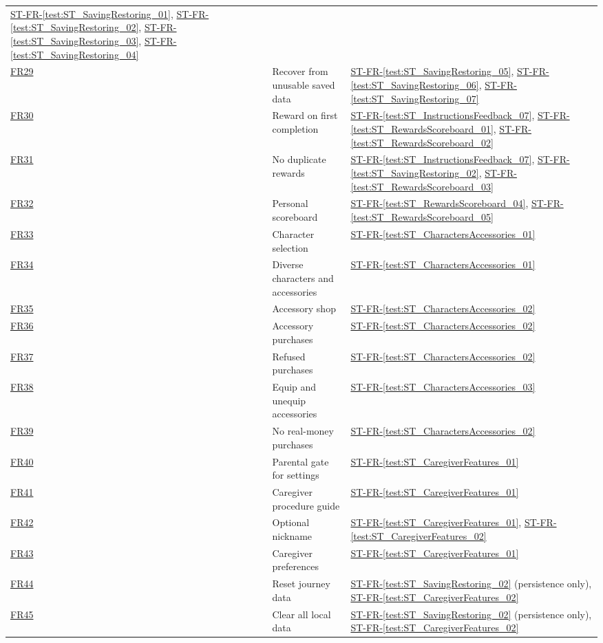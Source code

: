 \documentclass[10pt,titlepage]{article}
\newcommand{\frtestref}[1]{%
    \hyperref[test:#1]{ST-FR-\ref*{test:#1}}}
\newcommand{\srsurl}{https://team-hindsight.github.io/ophthamology-game/SRS/SRS.pdf}
\newcommand{\srsfrref}[2]{\href{\srsurl\#nameddest=#1}{FR#2}}
\begin{document}
\begin{longtable}{@{}>{\raggedright\arraybackslash}p{}
  >{\raggedright\arraybackslash}p{}
  >{\raggedright\arraybackslash}p{}@{}}
  \frtestref{ST_SavingRestoring_01}, \frtestref{ST_SavingRestoring_02}, \frtestref{ST_SavingRestoring_03}, \frtestref{ST_SavingRestoring_04}\\
\srsfrref{FR_CorruptData}{29} & Recover from unusable saved data &
  \frtestref{ST_SavingRestoring_05}, \frtestref{ST_SavingRestoring_06}, \frtestref{ST_SavingRestoring_07}\\
\srsfrref{FR_FirstReward}{30} & Reward on first completion &
  \frtestref{ST_InstructionsFeedback_07}, \frtestref{ST_RewardsScoreboard_01}, \frtestref{ST_RewardsScoreboard_02}\\
\srsfrref{FR_NoDuplicateReward}{31} & No duplicate rewards &
  \frtestref{ST_InstructionsFeedback_07}, \frtestref{ST_SavingRestoring_02}, \frtestref{ST_RewardsScoreboard_03}\\
\srsfrref{FR_Scoreboard}{32} & Personal scoreboard &
  \frtestref{ST_RewardsScoreboard_04}, \frtestref{ST_RewardsScoreboard_05}\\
\srsfrref{FR_ChooseCharacter}{33} & Character selection & \frtestref{ST_CharactersAccessories_01}\\
\srsfrref{FR_DiverseCharacters}{34} & Diverse characters and accessories & \frtestref{ST_CharactersAccessories_01}\\
\srsfrref{FR_Shop}{35} & Accessory shop & \frtestref{ST_CharactersAccessories_02}\\
\srsfrref{FR_Purchase}{36} & Accessory purchases & \frtestref{ST_CharactersAccessories_02}\\
\srsfrref{FR_PurchaseRefused}{37} & Refused purchases & \frtestref{ST_CharactersAccessories_02}\\
\srsfrref{FR_Equip}{38} & Equip and unequip accessories & \frtestref{ST_CharactersAccessories_03}\\
\srsfrref{FR_NoRealMoney}{39} & No real-money purchases & \frtestref{ST_CharactersAccessories_02}\\
\srsfrref{FR_ParentGate}{40} & Parental gate for settings & \frtestref{ST_CaregiverFeatures_01}\\
\srsfrref{FR_ProcedureGuide}{41} & Caregiver procedure guide & \frtestref{ST_CaregiverFeatures_01}\\
\srsfrref{FR_Nickname}{42} & Optional nickname &
  \frtestref{ST_CaregiverFeatures_01}, \frtestref{ST_CaregiverFeatures_02}\\
\srsfrref{FR_Preferences}{43} & Caregiver preferences & \frtestref{ST_CaregiverFeatures_01}\\
\srsfrref{FR_ResetJourney}{44} & Reset journey data &
  \frtestref{ST_SavingRestoring_02} (persistence only), \frtestref{ST_CaregiverFeatures_02}\\
\srsfrref{FR_ClearAllData}{45} & Clear all local data &
  \frtestref{ST_SavingRestoring_02} (persistence only), \frtestref{ST_CaregiverFeatures_02}\\


\end{longtable}
\end{document}
